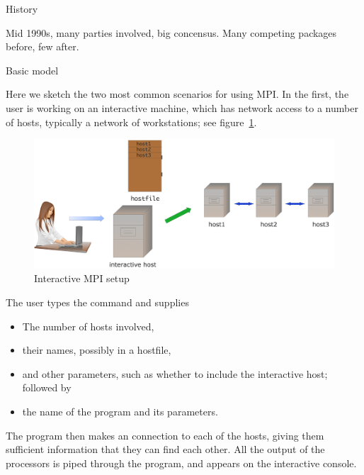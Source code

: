  {History}

Mid 1990s, many parties involved, big concensus. Many competing packages
before, few after.

 {Basic model}

Here we sketch the two most common scenarios for using MPI. In the
first, the user is working on an interactive machine, which has
network access to a number of hosts, typically a network of workstations;
see figure~\ref{fig:mpi-interactive}.
\begin{figure}[ht]
  \includegraphics[scale=.12]{graphics/mpi-interactive}
  \caption{Interactive MPI setup}
  \label{fig:mpi-interactive}
\end{figure}
The user types the command  and supplies
\begin{itemize}
\item The number of hosts involved,
\item their names, possibly in a hostfile,
\item and other parameters, such as whether to include the interactive
  host; followed by
\item the name of the program and its parameters.
\end{itemize}
The  program then makes an  connection
to each of the hosts, giving them sufficient information that they 
can find each other. All the output of the processors is piped through the 
 program, and appears on the interactive console.

